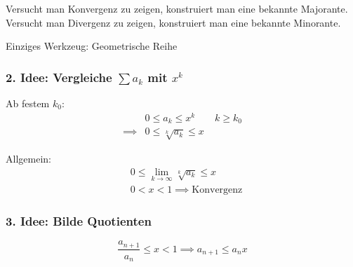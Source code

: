 Versucht man Konvergenz zu zeigen, konstruiert man eine bekannte Majorante.\newline
Versucht man Divergenz zu zeigen, konstruiert man eine bekannte Minorante. \newline

\noindent Einziges Werkzeug: Geometrische Reihe

\subsubsection*{2. Idee: Vergleiche $ \sum a_k $ mit $x^k$}
Ab festem \( k_0 \):
\begin{align*}
	&0 \leq a_k \leq x^k \qquad k \geq k_0 \\
	\implies &0 \leq \sqrt[k]{a_k} \leq x
\end{align*}

\noindent Allgemein:
\begin{align*}
	&0 \leq \lim_{k\rightarrow\infty} \sqrt[k]{a_k} \leq x \\
	&0 < x < 1 \implies \text{Konvergenz}
\end{align*}

\subsubsection*{3. Idee: Bilde Quotienten} %
\label{sub:3_idee}

\[
	\frac{a_{n+1}}{a_n} \leq x < 1 \implies a_{n+1} \leq a_n x
\]

